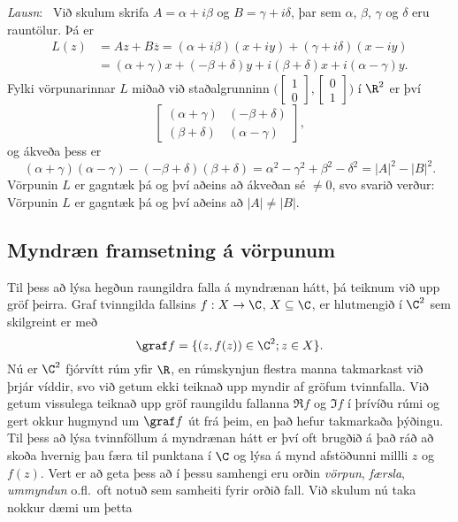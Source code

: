 \smallskip\noindent
{\it Lausn}: \ 
Við skulum skrifa $A={\alpha}+i{\beta}$ og
$B={\gamma}+i{\delta}$, þar sem ${\alpha}$, ${\beta}$, ${\gamma}$ og
${\delta}$ eru rauntölur.  Þá er
\begin{align*}
L(z)&=Az+B\overline z= ({\alpha}+i{\beta})(x+iy)+({\gamma}+i{\delta})(x-iy)\\
&=({\alpha}+{\gamma})x+(-{\beta}+{\delta})y+
i({\beta}+{\delta})x+i({\alpha}-{\gamma})y.
\end{align*}
Fylki vörpunarinnar $L$ miðað við staðalgrunninn
$\big(\left[\begin{matrix}1 \\ 0\end{matrix}\right],
\left[\begin{matrix}0 \\ 1\end{matrix}\right]\big)$ í
$\R^2$ er því
$$
\left[\begin{matrix} ({\alpha}+{\gamma}) & (-{\beta}+{\delta})\\
({\beta}+{\delta}) & ({\alpha}-{\gamma})\end{matrix}\right],
$$
og ákveða þess er 
$$
({\alpha}+{\gamma})({\alpha}-{\gamma})
      -(-{\beta}+{\delta})({\beta}+{\delta})
={\alpha}^2-{\gamma}^2+{\beta}^2-{\delta}^2=|A|^2-|B|^2.
$$
Vörpunin $L$ er gagntæk þá og því aðeins að ákveðan sé $\neq 0$, svo svarið
verður:  Vörpunin  $L$ er gagntæk þá og því aðeins að  $|A|\neq |B|$.


\subsection*{Myndræn framsetning á vörpunum}

Til þess að lýsa hegðun raungildra falla á myndrænan hátt, þá teiknum
við upp gröf þeirra.  Graf tvinngilda fallsins $f:X\to \C$, 
$X\subseteq \C$, er hlutmengið í $\C^2$ sem skilgreint er með
$$
\graf f=\{(z,f(z))\in \C^2; z\in X\}.
$$
Nú er $\C^2$ fjórvítt rúm yfir $\R$, en rúmskynjun flestra manna
takmarkast við þrjár víddir, svo við getum ekki teiknað upp myndir  af
gröfum tvinnfalla.  Við getum vissulega teiknað upp gröf raungildu
fallanna $\Re f$ og $\Im f$ í þrívíðu rúmi og gert okkur hugmynd 
um $\graf f$ út frá þeim, en það hefur takmarkaða þýðingu.  
Til þess að lýsa tvinnföllum á myndrænan hátt er því oft brugðið á það
ráð að skoða hvernig þau færa til punktana í $\C$ og lýsa á mynd
afstöðunni millli $z$ og $f(z)$. Vert er að geta þess að í þessu
samhengi eru orðin {\it vörpun}, {\it færsla}, {\it ummyndun}
o.fl.~oft notuð sem samheiti fyrir orðið fall.
Við skulum nú taka nokkur dæmi um þetta



